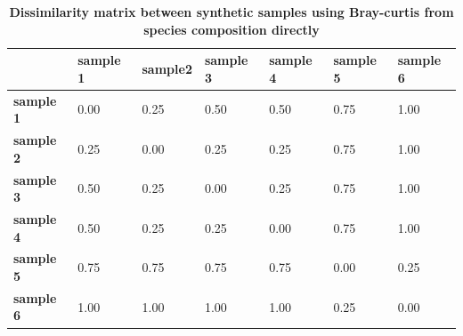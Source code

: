 \begin{table}[h]
\begin{tabular}{|l|l|l|l|l|l|l|}
\hline
                  & \textbf{sample 1} & \textbf{sample2} & \textbf{sample 3} & \textbf{sample 4} & \textbf{sample 5} & \textbf{sample 6} \\ \hline
\textbf{sample 1} & 0.00              & 0.25             & 0.50              & 0.50              & 0.75              & 1.00              \\ \hline
\textbf{sample 2} & 0.25              & 0.00             & 0.25              & 0.25              & 0.75              & 1.00              \\ \hline
\textbf{sample 3} & 0.50              & 0.25             & 0.00              & 0.25              & 0.75              & 1.00              \\ \hline
\textbf{sample 4} & 0.50              & 0.25             & 0.25              & 0.00              & 0.75              & 1.00              \\ \hline
\textbf{sample 5} & 0.75              & 0.75             & 0.75              & 0.75              & 0.00              & 0.25              \\ \hline
\textbf{sample 6} & 1.00              & 1.00             & 1.00              & 1.00              & 0.25              & 0.00              \\ \hline
\end{tabular}
\caption{\bf Dissimilarity matrix between synthetic samples using Bray-curtis from species composition directly }
\label{table:simulated_real_matrix}
\end{table}

